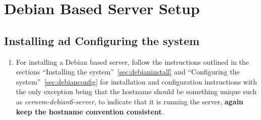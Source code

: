 \section{Debian Based Server Setup}
\subsection{Installing ad Configuring the system}
\flushleft
\begin{enumerate}
\item 	For installing a Debian based server, follow the instructions outlined in the sections ``Installing the 
		system''~\ref{sec:debianinstall} and ``Configuring the system''~\ref{sec:debianconfig} for installation and configuration 
		instructions with the only exception being that the hostname should be something unique such as \emph{cernvm-debian6-server}, to 
		indicate that it is running the \tapper server, {\bf again keep the hostname convention consistent}.
\end{enumerate}


\newpage
